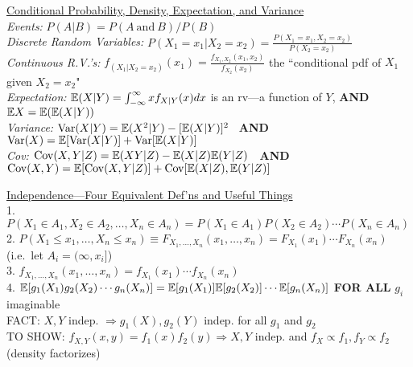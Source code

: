 \documentclass[11pt]{article}
\newcommand{\Var}{\ensuremath{\mathrm{Var}}}
\newcommand{\Cov}{\ensuremath{\mathrm{Cov}}}
\newcommand{\Exp}{\Bbb{E}}
\begin{document}
\indent\underline{Conditional Probability, Density, Expectation, and Variance}\\
{\it Events:} $P(A|B) = P(A \mathrm{\ and\ } B)/P(B)$\\
%
{\it Discrete Random Variables:} $P(X_1=x_1|X_2 = x_2) =\frac{P(X_1=x_1, X_2 =
x_2)}{P(X_2 = x_2)}$\\
%
{\it Continuous R.V.'s:} $f_{(X_1|X_2 = x_2)}(x_1) =
\frac{f_{X_1,X_2}(x_1,x_2)}{f_{X_2}(x_2)}$ the ``conditional pdf of $X_1$ given $X_2 =
x_2$"\\
%
{\it Expectation:}  $\Exp(X|Y) = \int_{-\infty}^\infty x f_{X|Y}(x)dx$ is an rv---a
function of $Y$,  \textbf{AND} $\Exp X = \Exp(\Exp(X|Y))$\\
%
{\it Variance:} $\Var(X|Y) = \Exp(X^2|Y)- [\Exp(X|Y)]^2$ \  \textbf{AND} \ $\Var(X) = \Exp[\Var(X|Y)] +
\Var[\Exp(X|Y)]$\\
{\it Cov:} \mbox{$\Cov(X,Y|Z) = \Exp(XY|Z) - \Exp(X|Z)\Exp(Y|Z)$ \ \textbf{AND} \ $\Cov(X,Y) =
\Exp[\Cov(X,Y |Z)] +
\Cov[\Exp(X|Z),\Exp(Y|Z)]$}

\indent \underline{Independence---Four Equivalent Def'ns and Useful Things}\\
1. $P(X_1\in A_1,X_2\in A_2,\ldots , X_n \in A_n) = P(X_1\in A_1)P(X_2\in A_2)\cdots
P(X_n \in A_n)$\\
2. $P(X_1\leq x_1,\ldots , X_n\leq x_n) \equiv F_{X_1,\ldots ,X_n}(x_1,\ldots ,x_n) =
F_{X_1}(x_1)\cdots F_{X_n}(x_n)$  (i.e.\ let $A_i = (\infty,x_i]$)\\
3. $f_{X_1,\ldots ,X_n}(x_1,\ldots ,x_n) = f_{X_1}(x_1)\cdots f_{X_n}(x_n)$ \\
4. $\Exp[g_1(X_1)g_2(X_2)\cdots g_n(X_n)]=\Exp[g_1(X_1)]\Exp[g_2(X_2)]\cdots \Exp[g_n(X_n)]$
\textbf{FOR ALL} $g_i$ imaginable \\
FACT: $X,Y$ indep. $\Longrightarrow g_1(X),g_2(Y)$ indep. for all $g_1$ and $g_2$\\
TO SHOW: $f_{X,Y}(x,y) = f_1(x)f_2(y) \Longrightarrow X,Y$ indep. and $f_X\propto
f_1, f_Y\propto f_2$  (density factorizes)
\end{document}
